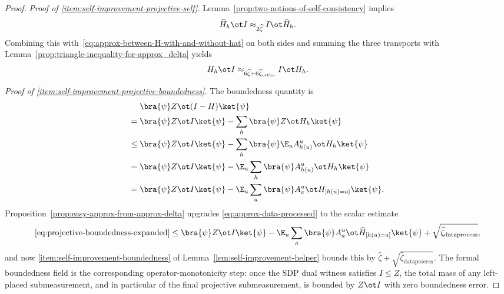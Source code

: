 \begin{proof}
  \emph{Proof of \ref{item:self-improvement-projective-self}.}
  Lemma~\ref{prop:two-notions-of-self-consistency} implies
  \[
    \widehat{H}_h \ot I \approx_{2\widehat{\zeta}} I \ot \widehat{H}_h.
  \]
  Combining this with~\eqref{eq:approx-between-H-with-and-without-hat} on both sides and summing the three transports with Lemma~\ref{prop:triangle-inequality-for-approx_delta} yields
  \[
    H_h \ot I \approx_{6 \widehat{\zeta} + 6\widehat{\zeta}_{\mathrm{ortho}}} I \ot H_h.
  \]

  \emph{Proof of \ref{item:self-improvement-projective-boundedness}.}
  The boundedness quantity is
  \begin{align}
    &\bra{\psi} Z \ot (I - H) \ket{\psi} \notag\\
    ={}& \bra{\psi} Z \ot I \ket{\psi} - \sum_h \bra{\psi} Z \ot H_h \ket{\psi} \notag\\
    \leq{}& \bra{\psi} Z \ot I \ket{\psi} - \sum_h \bra{\psi} \E_{u} A^{u}_{h(u)} \ot H_h \ket{\psi} \notag\\
    ={}& \bra{\psi} Z \ot I \ket{\psi} -\E_{u} \sum_h \bra{\psi}  A^{u}_{h(u)} \ot H_h \ket{\psi} \notag\\
    ={}& \bra{\psi} Z \ot I \ket{\psi} -\E_{u} \sum_a \bra{\psi}  A^{u}_{a} \ot H_{[h(u)=a]} \ket{\psi}. \label{eq:projective-boundedness-expanded}
  \end{align}
  Proposition~\ref{prop:easy-approx-from-approx-delta} upgrades
  \eqref{eq:approx-data-processed} to the scalar estimate
  \[
    \eqref{eq:projective-boundedness-expanded}
    \le \bra{\psi} Z \ot I \ket{\psi} -\E_{u} \sum_a \bra{\psi}  A^{u}_{a} \ot \widehat H_{[h(u)=a]} \ket{\psi} + \sqrt{\widehat{\zeta}_{\mathrm{dataprocess}}},
  \]
  and now \ref{item:self-improvement-boundedness} of Lemma~\ref{lem:self-improvement-helper} bounds this by $\widehat{\zeta} + \sqrt{\widehat{\zeta}_{\mathrm{dataprocess}}}$.
  The formal boundedness field
  is the corresponding operator-monotonicity step: once the SDP dual witness
  satisfies $I\le Z$, the total mass of any left-placed submeasurement, and in
  particular of the final projective submeasurement, is bounded by $Z\ot I$ with
  zero boundedness error.


\end{proof}
